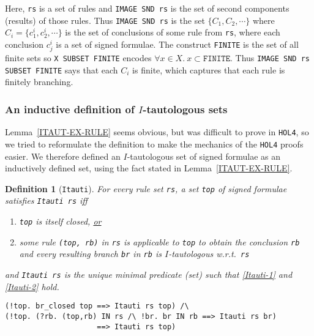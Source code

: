 \documentclass[a4paper]{article}
\newtheorem{lemma}{Lemma}
\newtheorem{definition}{Definition}
\newcommand{\hol}{\texttt{HOL4}}
\newcommand\comment[1]{}
\begin{document}
Here, \texttt{rs} is a set of rules and \texttt{IMAGE SND rs} is the
set of second components (results) of those rules. Thus \texttt{IMAGE
  SND rs} is the set $\{C_1, C_2, \cdots\}$ where
$C_i = \{c_1^i, c_2^i, \cdots \}$ is the set of conclusions of some rule
from \texttt{rs}, where each conclusion $c_j^i$ is a set of signed
formulae. The construct \texttt{FINITE} is the set of all finite sets
so \texttt{X SUBSET FINITE} encodes
$\forall x \in X.\ x \subset \mathtt{FINITE}$.
Thus \texttt{IMAGE SND rs SUBSET FINITE} says that each $C_i$ is
finite, which captures that each rule is finitely branching.

\comment{ deleted - referee's comment
\begin{lemma}
\texttt{IMAGE SND rs SUBSET FINITE} means that
every rule in \texttt{rs} is finitely branching.
\end{lemma}
\begin{verbatim}
IMAGE SND rs SUBSET FINITE <=> !t b. (t, b) IN rs ==> FINITE b
\end{verbatim}
}

\subsubsection{An inductive definition of $I$-tautologous sets}

Lemma~\ref{ITAUT-EX-RULE} seems obvious, but was difficult to prove in
\hol, so we tried to reformulate the definition to make the
mechanics of the \hol{} proofs easier. We therefore defined an $I$-tautologous
set of signed formulae as an inductively defined set, using the fact
stated in Lemma~\ref{ITAUT-EX-RULE}.
\begin{definition}[\texttt{Itauti}]\label{Itauti} 
  For every rule set \texttt{rs}, a set \texttt{top} of signed
  formulae satisfies \texttt{Itauti rs} iff
  \begin{enumerate} 
  \item \label{Itauti-1}
    \texttt{top} is itself closed, \underline{or}
  \item \label{Itauti-2}
   some rule \texttt{(top, rb)} in \texttt{rs} 
   is applicable to \texttt{top} to obtain the conclusion \texttt{rb} 
   and every resulting branch \texttt{br} in \texttt{rb} is
  $I$-tautologous w.r.t.\ \texttt{rs}
  \end{enumerate} 
  and \texttt{Itauti rs} is the unique minimal predicate (set) such that
  \ref{Itauti-1} and \ref{Itauti-2} hold.
\begin{verbatim} 
(!top. br_closed top ==> Itauti rs top) /\ 
(!top. (?rb. (top,rb) IN rs /\ !br. br IN rb ==> Itauti rs br)  
                     ==> Itauti rs top)
\end{verbatim}
\end{definition}
\end{document}
